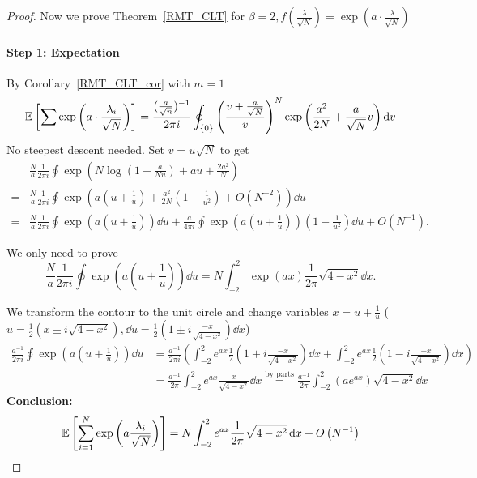 \begin{proof}
Now we prove Theorem~\ref{RMT_CLT} for $\beta=2,f(\frac{\lambda}{\sqrt{N}})=\exp(a\cdot\frac{\lambda}{\sqrt{N}})$

\paragraph{Step 1: Expectation}  By Corollary~\ref{RMT_CLT_cor} with $m=1$
\[
\mathbb{E}\left[\sum\exp\left(a\cdot\frac{\lambda_i}{\sqrt{N}}\right)\right]=\frac{(\frac{a}{\sqrt{n}})^{-1}}{2\pi i}\oint_{\{0\}}\left(\frac{v+\frac{a}{\sqrt{N}}}{v}\right)^N\exp\left(\frac{a^2}{2N}+\frac{a}{\sqrt{N}}v\right)\mathop{}\!\mathrm{d} v
\]
No steepest descent needed. Set $v=u\sqrt{N}$ to get
\begin{align*}
    &\frac{N}{a} \frac{1}{2\pi i} \oint \exp\left( N\log\left(1+\frac{a}{Nu}\right) + au + \frac{2a^2}{N}\right)\\
    =& \frac{N}{a} \frac{1}{2\pi i} \oint \exp\left(a\left(u+\frac{1}{u}\right) + \frac{a^2}{2N} \left( 1-\frac{1}{u^2} \right)+O(N^{-2})\right)\dd u\\
    =& \frac{N}{a} \frac{1}{2\pi i} \oint \exp\left(a\left(u+\frac{1}{u}\right)\right) \dd u + \frac{a}{4\pi i} \oint \exp\left(a\left(u+\frac{1}{u}\right)\right)\left(1-\frac{1}{u^2}\right) \dd u + O(N^{-1}).
\end{align*}

We only need to prove
\[
\frac{N}{a}\frac{1}{2\pi i}\oint\exp\left(a\left(u+\frac{1}{u}\right)\right)\dd u=N\int_{-2}^2\exp(ax)\frac{1}{2\pi}\sqrt{4-x^2}\dd x.
\]

We transform the contour to the unit circle and change variables $x=u+\frac{1}{u}$ ($u=\frac{1}{2}(x\pm i\sqrt{4-x^2}),\dd u=\frac{1}{2}(1\pm i\frac{-x}{\sqrt{4-x^2}})\dd x$)
\begin{align*}
\frac{a^{-1}}{2\pi i}\oint\exp\left(a\left(u+\frac{1}{u}\right)\right)\dd u&=\frac{a^{-1}}{2\pi i}\left(\int_{-2}
^2e^{ax}\frac{1}{2}(1+ i\frac{-x}{\sqrt{4-x^2}})\dd x+\int_{-2}
^2e^{ax}\frac{1}{2}(1- i\frac{-x}{\sqrt{4-x^2}})\dd x\right)\\
&=\frac{a^{-1}}{2\pi}\int_{-2}^2e^{ax}\frac{x}{\sqrt{4-x^2}}\dd x\overset{\text{by parts}}{=}\frac{a^{-1}}{2\pi}\int_{-2}^2(ae^{ax})\sqrt{4-x^2}\dd x
\end{align*}
\textbf{Conclusion:}
\[
\mathbb{E}\left[\sum_{i=1}^N\exp\left(a\frac{\lambda_i}{\sqrt{N}}\right)\right]=N\int_{-2}^2e^{ax}\frac{1}{2\pi}\sqrt{4-x^2}\mathop{}\!\mathrm{d} x+O\left(N^{-1}\right)
\]


\end{proof}
